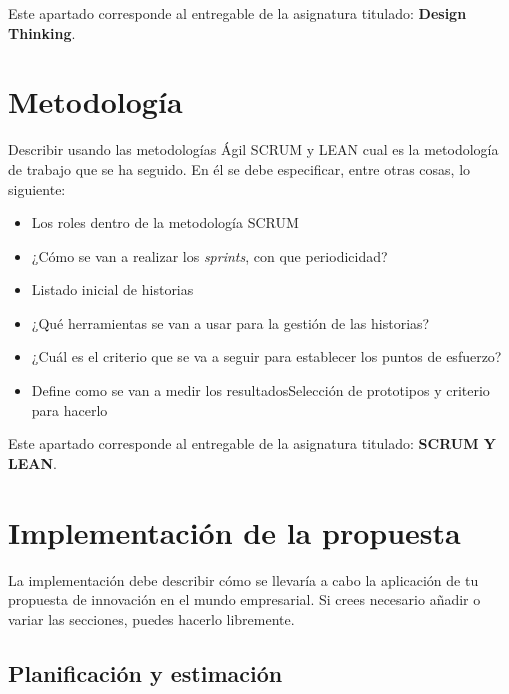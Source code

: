 \documentclass[12pt,a4paper]{proyectoinnovacion}
\begin{document}
\begin{quotebox}
  Este apartado corresponde al entregable de la asignatura titulado: \textbf{Design Thinking}.
\end{quotebox}


\section{Metodología}

Describir usando las metodologías Ágil SCRUM y LEAN cual es la metodología de trabajo que se ha seguido. En él se debe especificar, entre otras cosas, lo siguiente:

\begin{itemize}
  \item Los roles dentro de la metodología SCRUM
  \item ¿Cómo se van a realizar los \textit{sprints}, con que periodicidad?
  \item Listado inicial de historias
  \item ¿Qué herramientas se van a usar para la gestión de las historias?
  \item ¿Cuál es el criterio que se va a seguir para establecer los puntos de esfuerzo?
  \item Define como se van a medir los resultadosSelección de prototipos y criterio para hacerlo  
\end{itemize}

\begin{quotebox}
  Este apartado corresponde al entregable de la asignatura titulado: \textbf{SCRUM Y LEAN}.
\end{quotebox}

\section{Implementación de la propuesta}

La implementación debe describir cómo se llevaría a cabo la aplicación de tu propuesta de innovación en el mundo empresarial. Si crees necesario añadir o variar las secciones, puedes hacerlo libremente.

\subsection{Planificación y estimación}
\end{document}
